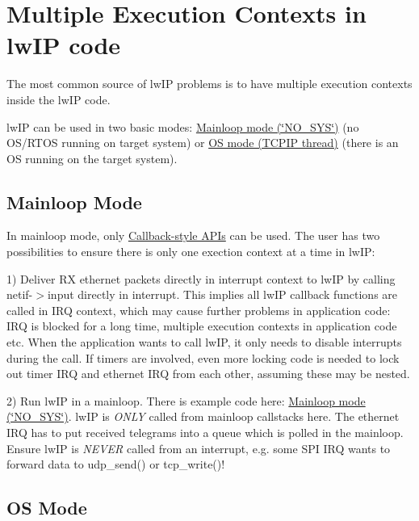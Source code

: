 \section*{Multiple Execution Contexts in lw\+IP code }

The most common source of lw\+IP problems is to have multiple execution contexts inside the lw\+IP code.

lw\+IP can be used in two basic modes\+: \hyperlink{group__lwip__nosys}{Mainloop mode (\char`\"{}\+N\+O\+\_\+\+S\+Y\+S\char`\"{})} (no O\+S/\+R\+T\+OS running on target system) or \hyperlink{group__lwip__os}{OS mode (T\+C\+P\+IP thread)} (there is an OS running on the target system).

\subsection*{Mainloop Mode }

In mainloop mode, only \hyperlink{group__callbackstyle__api}{Callback-\/style A\+P\+Is} can be used. The user has two possibilities to ensure there is only one exection context at a time in lw\+IP\+:

1) Deliver RX ethernet packets directly in interrupt context to lw\+IP by calling netif-\/$>$input directly in interrupt. This implies all lw\+IP callback functions are called in I\+RQ context, which may cause further problems in application code\+: I\+RQ is blocked for a long time, multiple execution contexts in application code etc. When the application wants to call lw\+IP, it only needs to disable interrupts during the call. If timers are involved, even more locking code is needed to lock out timer I\+RQ and ethernet I\+RQ from each other, assuming these may be nested.

2) Run lw\+IP in a mainloop. There is example code here\+: \hyperlink{group__lwip__nosys}{Mainloop mode (\char`\"{}\+N\+O\+\_\+\+S\+Y\+S\char`\"{})}. lw\+IP is {\itshape O\+N\+LY} called from mainloop callstacks here. The ethernet I\+RQ has to put received telegrams into a queue which is polled in the mainloop. Ensure lw\+IP is {\itshape N\+E\+V\+ER} called from an interrupt, e.\+g. some S\+PI I\+RQ wants to forward data to udp\+\_\+send() or tcp\+\_\+write()!

\subsection*{OS Mode }

